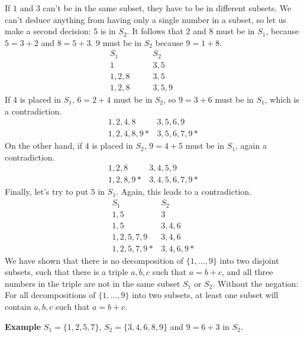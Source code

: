 \documentclass[11pt,a4paper]{article}
\begin{document}
If $1$ and $3$ can't be in the same subset, they have to be in different subsets. We can't deduce anything from having only a single number in a subset, so let us make a second decision: $5$ is in $S_2$. It follows that $2$ and $8$ must be in $S_1$, because $5=3+2$ and $8=5+3$. $9$ must be in $S_2$ because $9=1+8$.
\begin{displaymath}
\begin{array}{ll}
S_1 & S_2\\
1 & 3,5\\
1,2,8&3,5\\
1,2,8\quad\quad &3,5,9\quad\quad\quad
\end{array}
\end{displaymath}
If $4$ is placed in $S_1$, $6=2+4$ must be in $S_2$, so $9=3+6$ must be in $S_1$, which is a contradiction.
\begin{displaymath}
\begin{array}{ll}
1,2,4,8&3,5,6,9\\
1,2,4,8,9*&3,5,6,7,9*
\end{array}
\end{displaymath}
On the other hand, if $4$ is placed in $S_2$, $9=4+5$ must be in $S_1$, again a contradiction.
\begin{displaymath}
\begin{array}{ll}
1,2,8&3,4,5,9\\
1,2,8,9*&3,4,5,6,7,9*
\end{array}
\end{displaymath}
Finally, let's try to put $5$ in $S_1$. Again, this leads to a contradiction.
\begin{displaymath}
\begin{array}{ll}
S_1 & S_2\\
1,5& 3\\
1,5&3,4,6\\
1,2,5,7,9&3,4,6\\
1,2,5,7,9*&3,4,6,9*
\end{array}
\end{displaymath}
We have shown that there is no decomposition of $\{1,\ldots,9\}$ into two disjoint subsets, such that there is a triple $a,b,c$ such that $a= b+c$, and all three numbers in the triple are not in the same subset $S_1$ or $S_2$. Without the negation: For all decompositions of $\{1,\ldots,9\}$ into two subsets, at least one subset will contain $a,b,c$ such that $a=b+c$.

\textbf{Example} $S_1=\{1,2,5,7\},\, S_2=\{3,4,6,8,9\}$ and $9=6+3$ in $S_2$.
\end{document}
